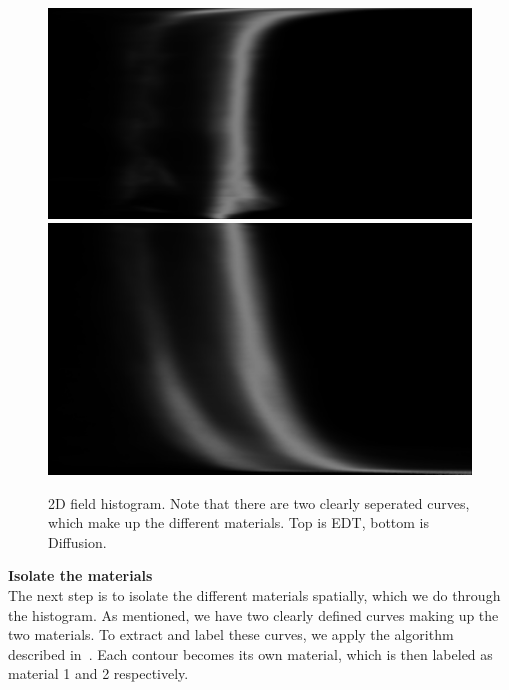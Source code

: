 \begin{figure}
    \includegraphics[width=\linewidth]{figures/fb-edt-bone_region3.png}
    \includegraphics[width=\linewidth]{figures/fb-gauss-bone_region3.png}
    \caption{2D field histogram. Note that there are two clearly seperated curves, which make up the different materials. Top is EDT, bottom is Diffusion.}
    \label{fig:field-hist}
\end{figure}

\vspace{\baselineskip}
\noindent\textbf{Isolate the materials} \\

The next step is to isolate the different materials spatially, which we do through the histogram.
As mentioned, we have two clearly defined curves making up the two materials.
To extract and label these curves, we apply the algorithm described in~.
Each contour becomes its own material, which is then labeled as material 1 and 2 respectively.

